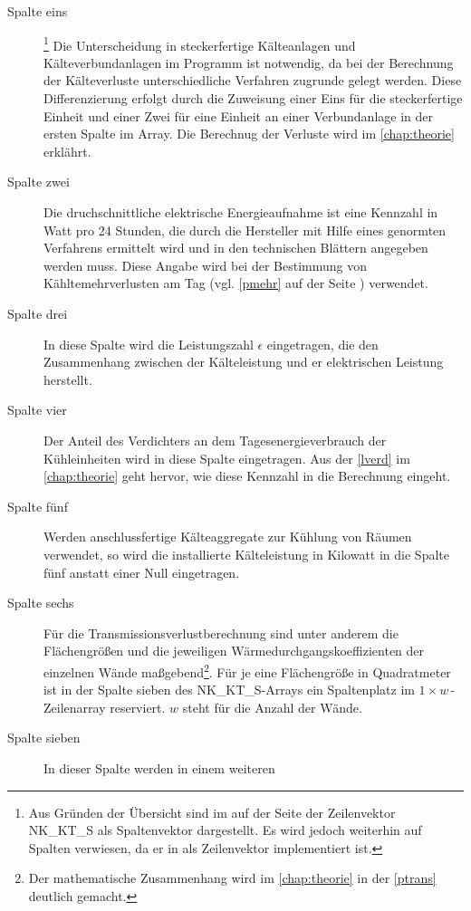 \begin{description}

	\item [Spalte eins]\footnote{ Aus Gr\"unden der \"Ubersicht sind im
	 auf der Seite \pageref{fridge} der Zeilenvektor
	NK\_KT\_S als Spaltenvektor dargestellt. Es wird jedoch weiterhin auf
	Spalten verwiesen, da er in \matlab als Zeilenvektor implementiert ist.}
	Die Unterscheidung in steckerfertige Kälteanlagen und
	Kälteverbundanlagen im Programm ist notwendig, da bei der Berechnung der
	Kälteverluste unterschiedliche Verfahren zugrunde gelegt werden. Diese
	Differenzierung erfolgt durch die Zuweisung einer Eins für die
	steckerfertige Einheit und einer Zwei für eine Einheit an einer
	Verbundanlage in der ersten Spalte im Array. Die Berechnug der Verluste
	wird im \cref{chap:theorie} erkl\"ahrt.
	\item [{Spalte zwei}] Die druchschnittliche elektrische Energieaufnahme
	ist eine Kennzahl in Watt pro 24 Stunden, die durch die Hersteller mit
	Hilfe eines genormten Verfahrens ermittelt wird und in den technischen
	Blättern angegeben werden muss. Diese Angabe wird bei der Bestimmung von
	K\"ahltemehrverlusten am Tag (vgl. \cref{pmehr} auf der Seite
	\pageref{pmehr}) verwendet.
	\item [{Spalte drei}] In diese Spalte wird die Leistungszahl $\epsilon$
	eingetragen, die den Zusammenhang zwischen der K\"alteleistung und er
	elektrischen Leistung herstellt.
	\item [{Spalte vier}] Der Anteil des Verdichters an dem
	Tagesenergieverbrauch der K\"uhleinheiten wird in diese Spalte
	eingetragen. Aus der \cref{lverd} im \cref{chap:theorie} geht hervor,
	wie diese Kennzahl in die Berechnung eingeht.
	\item [{Spalte fünf}] Werden anschlussfertige Kälteaggregate zur Kühlung
	von Räumen verwendet, so wird die installierte Kälteleistung in Kilowatt
	in die Spalte fünf anstatt einer Null eingetragen.
	\item [{Spalte sechs}] Für die Transmissionsverlustberechnung sind
	unter anderem die Flächengrößen und die jeweiligen
	Wärmedurchgangskoeffizienten der einzelnen Wände
	maßgebend\footnote{ Der mathematische Zusammenhang wird
	im \cref{chap:theorie} in der \cref{ptrans} deutlich gemacht.}. Für je
	eine Flächengröße in Quadratmeter ist in der Spalte sieben des
	NK\_KT\_S-Arrays ein Spaltenplatz im $1\times w\,$-Zeilenarray
	reserviert. $w$ steht für die Anzahl der Wände.
	\item [{Spalte sieben}] In dieser Spalte werden in einem weiteren

\end{description}
